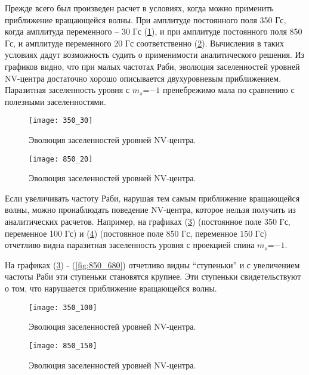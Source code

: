 Прежде всего был произведен расчет в условиях, когда можно применить
приближение вращающейся волны. При амплитуде постоянного поля 350 Гс,
когда амплитуда переменного -- 30 Гс (\ref{fig:350_30}), и при
амплитуде постоянного поля 850 Гс, и амплитуде переменного 20 Гс
соответственно (\ref{fig:850_20}). Вычисления в таких условиях дадут
возможность судить о применимости аналитического решения. Из графиков
видно, что при малых частотах Раби, эволюция заселенностей уровней
NV-центра достаточно хорошо описывается двухуровневым
приближением. Паразитная заселенность уровня с $m_s$=$-1$ пренебрежимо
мала по сравнению с полезными заселенностями.
\begin{figure}[h!]\centering
  \texttt{[image: 350\_30]}
  \caption{Эволюция заселенностей уровней NV-центра.}\label{fig:350_30}
\end{figure}
\begin{figure}[h!]\centering
  \texttt{[image: 850\_20]}
  \caption{Эволюция заселенностей уровней NV-центра.}\label{fig:850_20}
\end{figure}

Если увеличивать частоту Раби, нарушая тем самым приближение
вращающейся волны, можно пронаблюдать поведение NV-центра, которое
нельзя получить из аналитических расчетов. Например, на графиках
(\ref{fig:350_100}) (постоянное поле 350 Гс, переменное 100 Гс) и
(\ref{fig:850_150}) (постоянное поле 850 Гс, переменное 150 Гс)
отчетливо видна паразитная заселенность уровня с проекцией спина
$m_s$=$-1$.

На графиках (\ref{fig:350_100}) - (\ref{fig:850_680}) отчетливо видны
``ступеньки'' и с увеличением частоты Раби эти ступеньки становятся
крупнее. Эти ступеньки свидетельствуют о том, что нарушается
приближение вращающейся волны.
\begin{figure}[h!]\centering
  \texttt{[image: 350\_100]}
  \caption{Эволюция заселенностей уровней NV-центра.}\label{fig:350_100}
\end{figure}
\begin{figure}[h!]\centering
  \texttt{[image: 850\_150]}
  \caption{Эволюция заселенностей уровней NV-центра.}\label{fig:850_150}
\end{figure}

